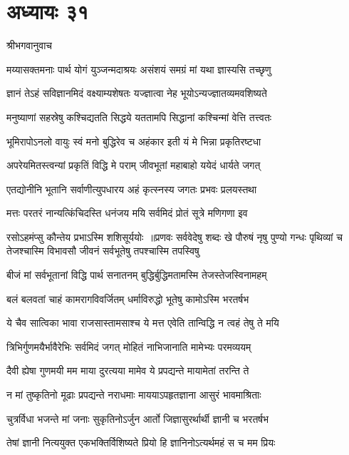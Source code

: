 \chapter{अध्यायः ३१}
\twolineshloka
{श्रीभगवानुवाच}
{}


\twolineshloka
{मय्यासक्तमनाः पार्थ योगं युञ्जन्मदाश्रयः}
{असंशयं समग्रं मां यथा ज्ञास्यसि तच्छृणु}


\twolineshloka
{ज्ञानं तेऽहं सविज्ञानमिदं वक्ष्याम्यशेषतः}
{यज्ज्ञात्वा नेह भूयोऽन्यज्ज्ञातव्यमवशिष्यते}


\twolineshloka
{मनुष्याणां सहस्रेषु कश्चिद्यतति सिद्धये}
{यततामपि सिद्धानां कश्चिन्मां वेत्ति तत्त्वतः}


\twolineshloka
{भूमिरापोऽनलो वायुः स्वं मनो बुद्धिरेव च}
{अहंकार इती यं मे भिन्ना प्रकृतिरष्टधा}


\twolineshloka
{अपरेयमितस्त्वन्यां प्रकृतिं विद्धि मे पराम्}
{जीवभूतां महाबाहो ययेदं धार्यते जगत्}


\twolineshloka
{एतद्योनीनि भूतानि सर्वाणीत्युपधारय}
{अहं कृत्स्नस्य जगतः प्रभवः प्रलयस्तथा}


\twolineshloka
{मत्तः परतरं नान्यत्किंचिदस्ति धनंजय}
{मयि सर्वमिदं प्रोतं सूत्रे मणिगणा इव}


रसोऽहमंप्सु कौन्तेय प्रभाऽस्मि शशिसूर्ययोः ॥प्रणवः सर्ववेदेषु शब्दः खे पौरुषं नृषु
\twolineshloka
{पुण्यो गन्धः पृथिव्यां च तेजश्चास्मि विभावसौ}
{जीवनं सर्वभूतेषु तपश्चास्मि तपस्विषु}


\twolineshloka
{बीजं मां सर्वभूतानां विद्धि पार्थ सनातनम्}
{बुद्धिर्बुद्धिमतामस्मि तेजस्तेजस्विनामहम्}


\twolineshloka
{बलं बलवतां चाहं कामरागविवर्जितम्}
{धर्माविरुद्धो भूतेषु कामोऽस्मि भरतर्षभ}


\twolineshloka
{ये चैव सात्विका भावा राजसास्तामसाश्च ये}
{मत्त एवेति तान्विद्धि न त्वहं तेषु ते मयि}


\twolineshloka
{त्रिभिर्गुणमयैर्भावैरेभिः सर्वमिदं जगत्}
{मोहितं नाभिजानाति मामेभ्यः परमव्ययम्}


\twolineshloka
{दैवी ह्येषा गुणमयी मम माया दुरत्यया}
{मामेव ये प्रपद्यन्ते मायामेतां तरन्ति ते}


\twolineshloka
{न मां तुष्कृतिनो मूढाः प्रपद्यन्ते नराधमाः}
{माययाऽपहृतज्ञाना आसुरं भावमाश्रिताः}


\twolineshloka
{चुत्रर्विधा भजन्ते मां जनाः सुकृतिनोऽर्जुन}
{आर्तो जिज्ञासुरर्थार्थी ज्ञानी च भरतर्षभ}


\twolineshloka
{तेषां ज्ञानी नित्ययुक्त एकभक्तिर्विशिष्यते}
{प्रियो हि ज्ञानिनोऽत्यर्थमहं स च मम प्रियः}


